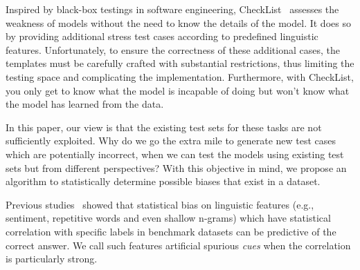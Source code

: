 Inspired by black-box testings in software engineering, 
CheckList~\cite{checklist2020acl} assesses the weakness of 
models without the need to know the details of the model. It does so by
providing additional stress test cases according to predefined 
linguistic features. Unfortunately, to ensure the correctness of
these additional cases, the templates must be carefully crafted
with substantial restrictions, thus limiting the testing space and
complicating the implementation. 
Furthermore, with CheckList, you only get to know what the model 
is incapable of doing but won't know what the model has 
learned from the data.


In this paper, our view is that the existing test sets for these
tasks are not sufficiently exploited. Why do we go the extra mile to
generate new test cases which are potentially incorrect, when we can
test the models using existing test sets but from different perspectives?
With this objective in mind, we propose an algorithm to statistically 
determine possible biases that exist in a dataset.

Previous studies~\cite{gururangan2018annotation,sanchez2018behavior,poliak2018hypothesis} 
showed that statistical bias on linguistic features 
(e.g., sentiment, repetitive words and even shallow n-grams)
which have statistical correlation with specific labels 
in benchmark datasets can be predictive of the correct 
answer. We call such features artificial spurious \textit{cues} when
the correlation is particularly strong.

